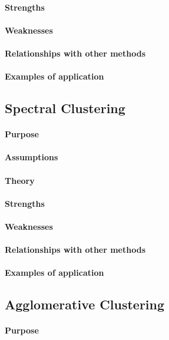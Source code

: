 \paragraph{Strengths}
\paragraph{Weaknesses}
\paragraph{Relationships with other methods}
\paragraph{Examples of application}

\subsection{Spectral Clustering}
\paragraph{Purpose}
\paragraph{Assumptions}
\paragraph{Theory}
\paragraph{Strengths}
\paragraph{Weaknesses}
\paragraph{Relationships with other methods}
\paragraph{Examples of application}


\subsection{Agglomerative Clustering}
\paragraph{Purpose}
